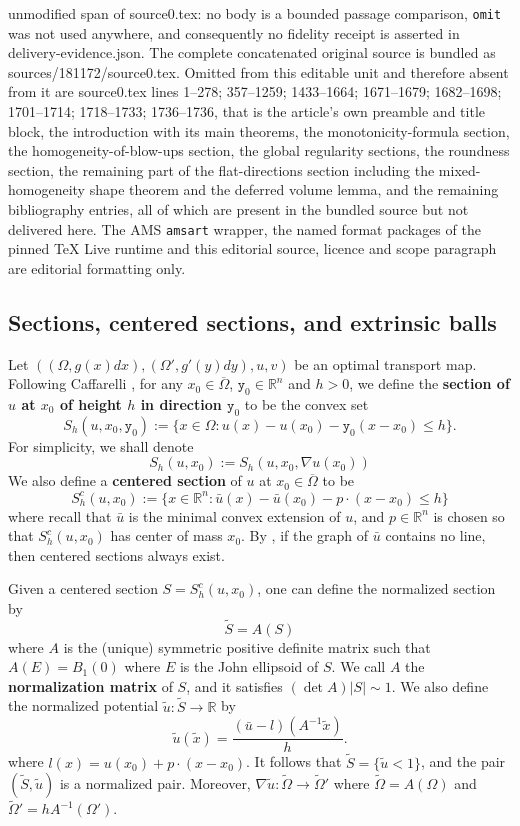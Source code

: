 \documentclass[10pt,a4paper]{amsart}
\numberwithin{equation}{section}
\begin{document}
unmodified span of source0.tex: no body is a bounded passage comparison, \texttt{omit} was not used anywhere, and consequently no fidelity receipt is asserted in delivery-evidence.json. The complete concatenated original source is bundled as sources/181172/source0.tex. Omitted from this editable unit and therefore absent from it are source0.tex lines 1--278; 357--1259; 1433--1664; 1671--1679; 1682--1698; 1701--1714; 1718--1733; 1736--1736, that is the article's own preamble and title block, the introduction with its main theorems, the monotonicity-formula section, the homogeneity-of-blow-ups section, the global regularity sections, the roundness section, the remaining part of the flat-directions section including the mixed-homogeneity shape theorem and the deferred volume lemma, and the remaining bibliography entries, all of which are present in the bundled source but not delivered here. The AMS \texttt{amsart} wrapper, the named format packages of the pinned TeX Live runtime and this editorial source, licence and scope paragraph are editorial formatting only.\par\smallskip
\setcounter{section}{2}
\setcounter{equation}{3}
\setcounter{claim}{0}
\setcounter{conj}{0}
\setcounter{corr}{0}
\setcounter{defn}{4}
\setcounter{example}{0}
\setcounter{lem}{0}
\setcounter{prop}{2}
\setcounter{ques}{0}
\setcounter{remark}{1}
\setcounter{theorem}{0}
\subsection{Sections, centered sections, and extrinsic balls}
Let $((\Omega, g(x)dx), (\Omega', g'(y)dy), u, v)$ be an optimal transport map. Following Caffarelli \cite{Caffarelli}, for any $x_0\in \overline\Omega$, $\mathtt{y}_0\in\mathbb{R}^n$ and $h>0$, we define the {\bf section of $u$ at $x_0$ of height $h$ in direction $\mathtt{y}_0$} to be the convex set
\[S_h(u, x_0, \mathtt{y}_0) := \{x\in\Omega: u(x)-u(x_0)-\mathtt{y}_0(x-x_0)\leq h\}.\]
For simplicity, we shall denote
\[
S_{h}(u,x_0):= S_{h}(u,x_0, \nabla u(x_0))
\]
We also define a {\bf centered section} of $u$ at $x_0\in\overline\Omega$ to be
\[S^c_h(u, x_0) := \{x\in \mathbb R^n:\bar u(x)-\bar u(x_0)-p\cdot (x-x_0)\leq h\}\]
where recall that $\bar u$ is the minimal convex extension of $u$, and $p\in \mathbb R^n$ is chosen so that $S^c_h(u, x_0)$ has center of mass $x_0$. By \cite{Caffarelli2}, if the graph of $\bar u$ contains no line, then centered sections always exist. 

Given a centered section $S = S^c_h(u, x_0)$, one can define the normalized section by
\[\tilde S = A(S)\]
where $A$ is the (unique) symmetric positive definite matrix such that $A(E) = B_1(0)$ where $E$ is the John ellipsoid of $S$. We call $A$ the {\bf normalization matrix} of $S$, and it satisfies $(\det A)|S|\sim 1$. We also define the normalized potential $\tilde u:\tilde S\to \mathbb R$ by
\[\tilde u(\tilde x) = \frac{(\bar u-l)(A^{-1}\tilde x)}{h}.\]
where $l(x) = u(x_0)+p\cdot (x-x_0)$. It follows that $\tilde S = \{\tilde u<1\}$, and the pair $(\tilde S, \tilde u)$ is a normalized pair. Moreover, $\nabla \tilde u:\tilde\Omega\to\tilde\Omega'$ where $\tilde\Omega = A(\Omega)$ and $\tilde\Omega' = hA^{-1}(\Omega')$.  
\end{document}
